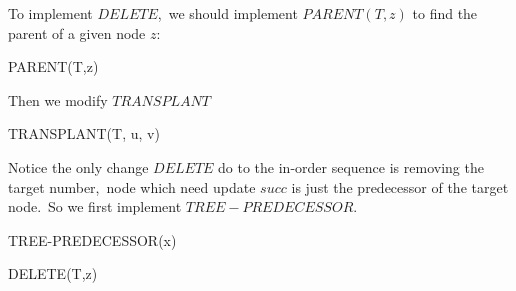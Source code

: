 \documentclass[]{article}
\begin{document}
	To implement $DELETE$,\ we should implement $PARENT(T,z)$ to find the parent of a given node $z$:
	\begin{algorithm}[H]
	\caption{PARENT(T,z)} %
	\begin{algorithmic}[1]
	\Else
	\EndIf
	\EndWhile
	\end{algorithmic}
	\end{algorithm}	

	Then we modify $TRANSPLANT$
	\begin{algorithm}[H]
		\caption{TRANSPLANT(T, u, v)} %
		\begin{algorithmic}[1]
		\Else
		\EndIf
		\end{algorithmic}
	\end{algorithm}

	Notice the only change $DELETE$ do to the in-order sequence is removing the target number,\ node which need update $succ$ is just the predecessor of the target node.\ So we first implement $TREE-PREDECESSOR$.
	
	\begin{algorithm}[H]
		\caption{TREE-PREDECESSOR(x)} %
		\begin{algorithmic}[1]
			\Else
			\EndWhile
			\EndIf
		\end{algorithmic}
	\end{algorithm}
	 
	\begin{algorithm}[H]
		\caption{DELETE(T,z)} %
		\begin{algorithmic}[1]
		\Else
		\EndIf
		\EndIf
		\end{algorithmic}
	\end{algorithm}	
\end{document}
